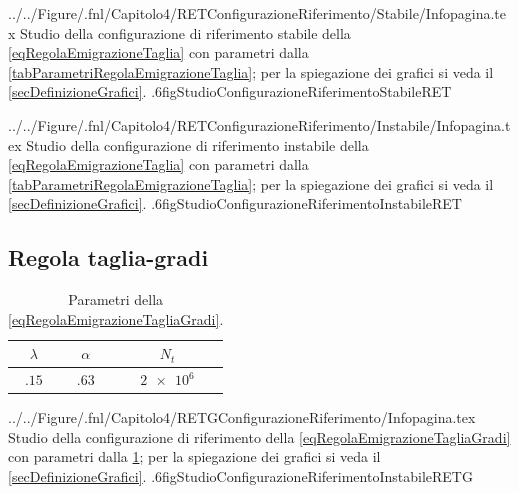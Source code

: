                 {../../Figure/.fnl/Capitolo4/RETConfigurazioneRiferimento/Stabile/Infopagina.tex}
                {Studio della configurazione di riferimento stabile della \ref{eqRegolaEmigrazioneTaglia} con parametri dalla \cref{tabParametriRegolaEmigrazioneTaglia}; per la spiegazione dei grafici si veda il \cref{secDefinizioneGrafici}.}
                {.6\linewidth}{figStudioConfigurazioneRiferimentoStabileRET}

                {../../Figure/.fnl/Capitolo4/RETConfigurazioneRiferimento/Instabile/Infopagina.tex}
                {Studio della configurazione di riferimento instabile della \ref{eqRegolaEmigrazioneTaglia} con parametri dalla \cref{tabParametriRegolaEmigrazioneTaglia}; per la spiegazione dei grafici si veda il \cref{secDefinizioneGrafici}.}
                {.6\linewidth}{figStudioConfigurazioneRiferimentoInstabileRET}

        \subsection{Regola taglia-gradi}


            \begin{table}[htb]
                \centering
                \begin{tabular}{ccc}
                    \hline
                    \(\lambda\)&\(\alpha\)&\(N_t\)\\
                    \hline
                    \(\num{.15}\)&\(\num{.63}\)&\(\num{2e6}\)\\
                    \hline
                \end{tabular}
                \caption{Parametri della \ref{eqRegolaEmigrazioneTagliaGradi}.}
                \label{tabParametriRegolaEmigrazioneTagliaGradi}
            \end{table}

                {../../Figure/.fnl/Capitolo4/RETGConfigurazioneRiferimento/Infopagina.tex}
                {Studio della configurazione di riferimento della \ref{eqRegolaEmigrazioneTagliaGradi} con parametri dalla \cref{tabParametriRegolaEmigrazioneTagliaGradi}; per la spiegazione dei grafici si veda il \cref{secDefinizioneGrafici}.}
                {.6\linewidth}{figStudioConfigurazioneRiferimentoInstabileRETG}

